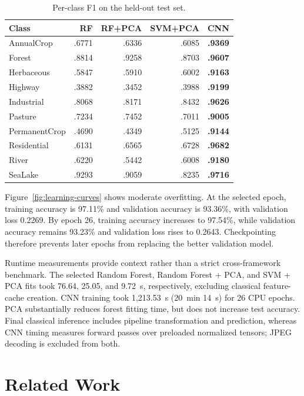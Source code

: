 \documentclass[conference]{IEEEtran}
\begin{document}
\begin{table}[t]
\centering
\caption{Per-class F1 on the held-out test set.}
\label{tab:per-class}
\footnotesize
\setlength{\tabcolsep}{3.6pt}
\begin{tabular}{lrrrr}
\toprule
Class & RF & RF+PCA & SVM+PCA & CNN \\
\midrule
AnnualCrop    & .6771 & .6336 & .6085 & \textbf{.9369} \\
Forest        & .8814 & .9258 & .8703 & \textbf{.9607} \\
Herbaceous    & .5847 & .5910 & .6002 & \textbf{.9163} \\
Highway       & .3882 & .3452 & .3988 & \textbf{.9199} \\
Industrial    & .8068 & .8171 & .8432 & \textbf{.9626} \\
Pasture       & .7234 & .7452 & .7011 & \textbf{.9005} \\
PermanentCrop & .4690 & .4349 & .5125 & \textbf{.9144} \\
Residential   & .6131 & .6565 & .6728 & \textbf{.9682} \\
River         & .6220 & .5442 & .6008 & \textbf{.9180} \\
SeaLake       & .9293 & .9059 & .8235 & \textbf{.9716} \\
\bottomrule
\end{tabular}
\end{table}

Figure~\ref{fig:learning-curves} shows moderate overfitting. At the selected
epoch, training accuracy is 97.11\% and validation accuracy is 93.36\%, with
validation loss 0.2269. By epoch 26, training accuracy increases to 97.54\%,
while validation accuracy remains 93.23\% and validation loss rises to 0.2643.
Checkpointing therefore prevents later epochs from replacing the better
validation model.

Runtime measurements provide context rather than a strict cross-framework
benchmark. The selected Random Forest, Random Forest + PCA, and SVM + PCA fits
took 76.64, 25.05, and 9.72~s, respectively, excluding classical feature-cache
creation. CNN training took 1,213.53~s (20~min 14~s) for 26 CPU epochs. PCA
substantially reduces forest fitting time, but does not increase test accuracy.
Final classical inference includes pipeline transformation and prediction,
whereas CNN timing measures forward passes over preloaded normalized tensors;
JPEG decoding is excluded from both.

\section{Related Work}
\end{document}
